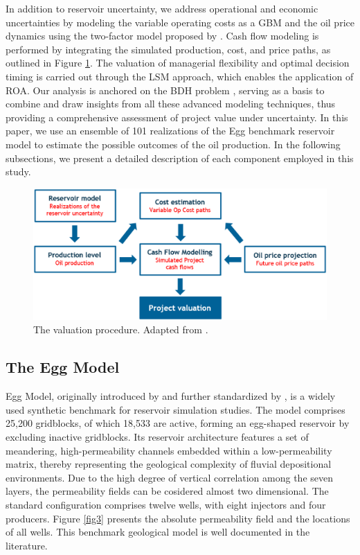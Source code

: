 \documentclass[pdflatex,sn-basic]{sn-jnl}%
\theoremstyle{thmstyleone}%
\theoremstyle{thmstyletwo}%
\theoremstyle{thmstylethree}%
\begin{document}
In addition to reservoir uncertainty, we address operational and economic uncertainties by modeling the variable operating costs as a GBM and the oil price dynamics using the two-factor model proposed by \cite{ref17}. Cash flow modeling is performed by integrating the simulated production, cost, and price paths, as outlined in Figure \ref{fig2}. The valuation of managerial flexibility and optimal decision timing is carried out through the LSM approach, which enables the application of ROA. Our analysis is anchored on the BDH problem \citep{ref12a}, serving as a basis to combine and draw insights from all these advanced modeling techniques, thus providing a comprehensive assessment of project value under uncertainty. In this paper, we use an ensemble of 101 realizations of the Egg benchmark reservoir model to estimate the possible outcomes of the oil production. In the following subsections, we present a detailed description of each component employed in this study.

\begin{figure}[H]
\centering
\begin{minipage}{0.95\textwidth}
  \includegraphics[width=\textwidth]{valuation.eps}
  \caption{The valuation procedure. Adapted from \cite{ref22}.}
  \label{fig2}
\end{minipage}
\end{figure}

\subsection{The Egg Model}\label{subsec41}

Egg Model, originally introduced by \cite{ref23} and further standardized by \cite{ref18}, is a widely used synthetic benchmark for reservoir simulation studies. The model comprises 25,200 gridblocks, of which 18,533 are active, forming an egg-shaped reservoir by excluding inactive gridblocks. Its reservoir architecture features a set of meandering, high-permeability channels embedded within a low-permeability matrix, thereby representing the geological complexity of fluvial depositional environments. Due to the high degree of vertical correlation among the seven layers, the permeability fields can be cosidered almost two dimensional. The standard configuration comprises twelve wells, with eight injectors and four producers. Figure \ref{fig3} presents the absolute permeability field and the locations of all wells. This benchmark geological model is well documented in the literature. 
\end{document}
